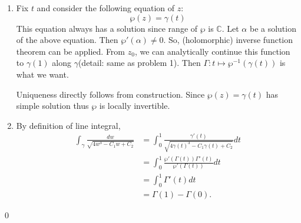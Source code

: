 \begin{problem}[10.5] \hfill
	\begin{enumerate}[label = (\alph*)]
		\item Fix $t$ and consider the following equation of $z$:
			\[
				\wp (z) = \gamma(t)
			\]
			This equation always has a solution since range of $\wp$ is $\mathbb{C}$.
			Let $\alpha$ be a solution of the above equation.
			Then $\wp '(\alpha) \ne 0$.
			So, (holomorphic) inverse function theorem can be applied.
			From $z_0$, we can analytically continue this function to $\gamma(1)$ along $\gamma$(detail: same as problem 1).
			Then $\Gamma: t \mapsto \wp^{-1}(\gamma(t))$ is what we want.

			Uniqueness directly follows from construction. Since $\wp(z) = \gamma(t)$ has simple solution thus $\wp$ is locally invertible.

		\item By definition of line integral,
			\[
				\begin{split}
					\int_\gamma \frac{dw}{\sqrt{4w^3 -C_1 w + C_2}}
					& = \int_0^1 \frac{\gamma'(t)}{\sqrt{4\gamma(t)^3 -C_1 \gamma(t) + C_2}}dt \\
					& = \int_0^1 \frac{\wp'(\Gamma(t)) \Gamma'(t)}{\wp'(\Gamma(t))}dt \\
					& = \int_0^1 \Gamma'(t) dt \\
					& = \Gamma(1) - \Gamma(0).
				\end{split}
			\]
	\end{enumerate}
	
	\qed
\end{problem}
